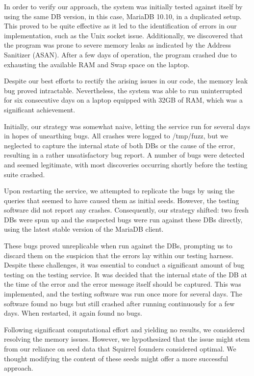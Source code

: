 \documentclass[sigconf]{acmart}
\begin{document}
In order to verify our approach, the system was initially tested against itself by using the same DB version, in this case, MariaDB 10.10, in a duplicated setup. This proved to be quite effective as it led to the identification of errors in our implementation, such as the Unix socket issue. Additionally, we discovered that the program was prone to severe memory leaks as indicated by the Address Sanitizer (ASAN). After a few days of operation, the program crashed due to exhausting the available RAM and Swap space on the laptop.

Despite our best efforts to rectify the arising issues in our code, the memory leak bug proved intractable. Nevertheless, the system was able to run uninterrupted for six consecutive days on a laptop equipped with 32GB of RAM, which was a significant achievement.

Initially, our strategy was somewhat naive, letting the service run for several days in hopes of unearthing bugs. All crashes were logged to /tmp/fuzz, but we neglected to capture the internal state of both DBs or the cause of the error, resulting in a rather unsatisfactory bug report. A number of bugs were detected and seemed legitimate, with most discoveries occurring shortly before the testing suite crashed.

Upon restarting the service, we attempted to replicate the bugs by using the queries that seemed to have caused them as initial seeds. However, the testing software did not report any crashes. Consequently, our strategy shifted: two fresh DBs were spun up and the suspected bugs were run against these DBs directly, using the latest stable version of the MariaDB client.

These bugs proved unreplicable when run against the DBs, prompting us to discard them on the suspicion that the errors lay within our testing harness. Despite these challenges, it was essential to conduct a significant amount of bug testing on the testing service. It was decided that the internal state of the DB at the time of the error and the error message itself should be captured. This was implemented, and the testing software was run once more for several days. The software found no bugs but still crashed after running continuously for a few days. When restarted, it again found no bugs.

Following significant computational effort and yielding no results, we considered resolving the memory issues. However, we hypothesized that the issue might stem from our reliance on seed data that Squirrel founders considered optimal. We thought modifying the content of these seeds might offer a more successful approach.
\end{document}
